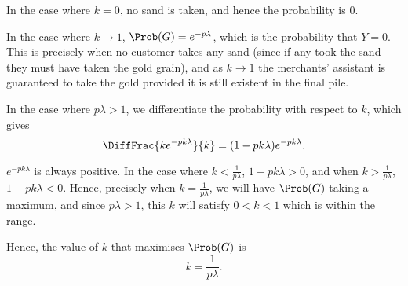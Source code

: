 \begin{enumerate}
          In the case where \(k = 0\), no sand is taken, and hence the probability is \(0\).

          In the case where \(k \to 1\), \(\Prob(G) = e^{-p\lambda}\), which is the probability that \(Y = 0\). This is precisely when no customer takes any sand (since if any took the sand they must have taken the gold grain), and as \(k \to 1\) the merchants' assistant is guaranteed to take the gold provided it is still existent in the final pile.

          In the case where \(p \lambda > 1\), we differentiate the probability with respect to \(k\), which gives
          \[
              \DiffFrac{k e^{-pk\lambda}}{k} = (1 - pk\lambda) e^{-pk\lambda}.
          \]

          \(e^{-pk\lambda}\) is always positive. In the case where \(k < \frac{1}{p\lambda}\), \(1 - pk\lambda > 0\), and when \(k > \frac{1}{p\lambda}\), \(1 - pk\lambda < 0\). Hence, precisely when \(k = \frac{1}{p\lambda}\), we will have \(\Prob(G)\) taking a maximum, and since \(p\lambda > 1\), this \(k\) will satisfy \(0 < k < 1\) which is within the range.

          Hence, the value of \(k\) that maximises \(\Prob(G)\) is
          \[
              k = \frac{1}{p\lambda}.
          \]
\end{enumerate}